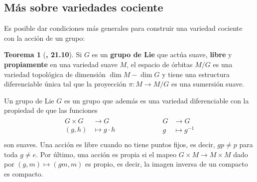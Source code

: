 \documentclass[spanish]{book}
\theoremstyle{definition}
\newtheorem*{teo}{Teorema}
\newtheorem*{lema}{Lema}
\newtheorem*{ejer*}{Ejercicio}
\begin{document}
	
	
	
	\subsection{Más sobre variedades cociente}
	Es posible dar condiciones más generales para construir una variedad cociente con la acción de un grupo:
	
	\begin{teo}[\cite{Lee}\textbf{, 21.10}]
		Si $G$ es un \textbf{grupo de Lie} que actúa suave, \textbf{libre} y \textbf{propiamente} en una variedad suave $M$, el espacio de órbitas $M/G$ es una variedad topológica de dimensión $\dim M-\dim G$ y tiene una estructura diferenciable única tal que la proyección $\pi:M\to M/G$ es una sumersión suave.
	\end{teo}
	
	Un grupo de Lie $G$ es un grupo que además es una variedad diferenciable con la propiedad de que las funciones
	\begin{align*}
		\begin{aligned}
			G\times G&\to G\\
			(g,h)&\mapsto g\cdot h\\
		\end{aligned}
		\qquad\qquad\qquad
		\begin{aligned}
			G&\to G\\
			g&\mapsto g^{-1}\\
		\end{aligned}
	\end{align*}
	son suaves. Una acción es libre cuando no tiene puntos fijos, es decir, $gp\neq p$ para toda $g\neq e$. Por último, una acción es propia si el mapeo $G\times M\to M\times M$ dado por $(g,m)\mapsto (gm,m)$ es propio, es decir, la imagen inversa de un compacto es compacto.
	
\end{document}
